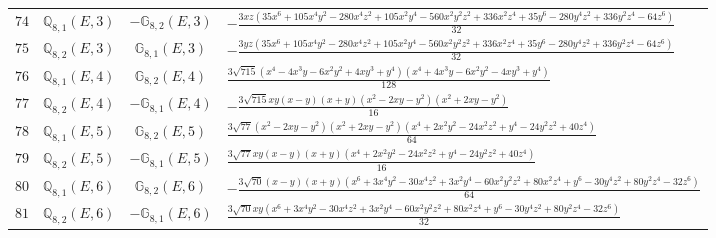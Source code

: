 \documentclass[fleqn,8pt,landscape]{jsarticle}
\begin{document}
\begin{table}[ht!]
\begin{center}
\begin{tabular}{cccl}
$ 74 $ & $ \mathbb{Q}_{8,1}(E,3) $ & $ -\mathbb{G}_{8,2}(E,3) $ & $ - \frac{3 x z \left(35 x^{6} + 105 x^{4} y^{2} - 280 x^{4} z^{2} + 105 x^{2} y^{4} - 560 x^{2} y^{2} z^{2} + 336 x^{2} z^{4} + 35 y^{6} - 280 y^{4} z^{2} + 336 y^{2} z^{4} - 64 z^{6}\right)}{32} $ \\
$ 75 $ & $ \mathbb{Q}_{8,2}(E,3) $ & $ \mathbb{G}_{8,1}(E,3) $ & $ - \frac{3 y z \left(35 x^{6} + 105 x^{4} y^{2} - 280 x^{4} z^{2} + 105 x^{2} y^{4} - 560 x^{2} y^{2} z^{2} + 336 x^{2} z^{4} + 35 y^{6} - 280 y^{4} z^{2} + 336 y^{2} z^{4} - 64 z^{6}\right)}{32} $ \\
$ 76 $ & $ \mathbb{Q}_{8,1}(E,4) $ & $ \mathbb{G}_{8,2}(E,4) $ & $ \frac{3 \sqrt{715} \left(x^{4} - 4 x^{3} y - 6 x^{2} y^{2} + 4 x y^{3} + y^{4}\right) \left(x^{4} + 4 x^{3} y - 6 x^{2} y^{2} - 4 x y^{3} + y^{4}\right)}{128} $ \\
$ 77 $ & $ \mathbb{Q}_{8,2}(E,4) $ & $ -\mathbb{G}_{8,1}(E,4) $ & $ - \frac{3 \sqrt{715} x y \left(x - y\right) \left(x + y\right) \left(x^{2} - 2 x y - y^{2}\right) \left(x^{2} + 2 x y - y^{2}\right)}{16} $ \\
$ 78 $ & $ \mathbb{Q}_{8,1}(E,5) $ & $ \mathbb{G}_{8,2}(E,5) $ & $ \frac{3 \sqrt{77} \left(x^{2} - 2 x y - y^{2}\right) \left(x^{2} + 2 x y - y^{2}\right) \left(x^{4} + 2 x^{2} y^{2} - 24 x^{2} z^{2} + y^{4} - 24 y^{2} z^{2} + 40 z^{4}\right)}{64} $ \\
$ 79 $ & $ \mathbb{Q}_{8,2}(E,5) $ & $ -\mathbb{G}_{8,1}(E,5) $ & $ \frac{3 \sqrt{77} x y \left(x - y\right) \left(x + y\right) \left(x^{4} + 2 x^{2} y^{2} - 24 x^{2} z^{2} + y^{4} - 24 y^{2} z^{2} + 40 z^{4}\right)}{16} $ \\
$ 80 $ & $ \mathbb{Q}_{8,1}(E,6) $ & $ \mathbb{G}_{8,2}(E,6) $ & $ - \frac{3 \sqrt{70} \left(x - y\right) \left(x + y\right) \left(x^{6} + 3 x^{4} y^{2} - 30 x^{4} z^{2} + 3 x^{2} y^{4} - 60 x^{2} y^{2} z^{2} + 80 x^{2} z^{4} + y^{6} - 30 y^{4} z^{2} + 80 y^{2} z^{4} - 32 z^{6}\right)}{64} $ \\
$ 81 $ & $ \mathbb{Q}_{8,2}(E,6) $ & $ -\mathbb{G}_{8,1}(E,6) $ & $ \frac{3 \sqrt{70} x y \left(x^{6} + 3 x^{4} y^{2} - 30 x^{4} z^{2} + 3 x^{2} y^{4} - 60 x^{2} y^{2} z^{2} + 80 x^{2} z^{4} + y^{6} - 30 y^{4} z^{2} + 80 y^{2} z^{4} - 32 z^{6}\right)}{32} $ \\
 \hline \hline
\end{tabular}
\end{center}
\end{table}
\end{document}

